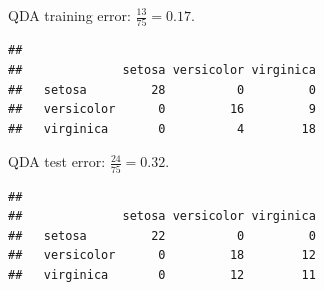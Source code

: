 \documentclass[10pt,ignorenonframetext,]{beamer}
\newenvironment{Shaded}{\begin{snugshade}}{\end{snugshade}}
\newcommand{\KeywordTok}[1]{\textcolor[rgb]{0.13,0.29,0.53}{\textbf{#1}}}
\newcommand{\DataTypeTok}[1]{\textcolor[rgb]{0.13,0.29,0.53}{#1}}
\newcommand{\StringTok}[1]{\textcolor[rgb]{0.31,0.60,0.02}{#1}}
\newcommand{\OperatorTok}[1]{\textcolor[rgb]{0.81,0.36,0.00}{\textbf{#1}}}
\newcommand{\NormalTok}[1]{#1}
\begin{document}
\begin{frame}[fragile]

QDA training error: \(\frac{13}{75} =0.17\).

\scriptsize

\begin{Shaded}
\end{Shaded}

\begin{verbatim}
##             
##              setosa versicolor virginica
##   setosa         28          0         0
##   versicolor      0         16         9
##   virginica       0          4        18
\end{verbatim}

\normalsize

\vspace{2mm}

QDA test error: \(\frac{24}{75}=0.32\).

\scriptsize

\begin{Shaded}
\end{Shaded}

\begin{verbatim}
##             
##              setosa versicolor virginica
##   setosa         22          0         0
##   versicolor      0         18        12
##   virginica       0         12        11
\end{verbatim}

\end{frame}
\end{document}
